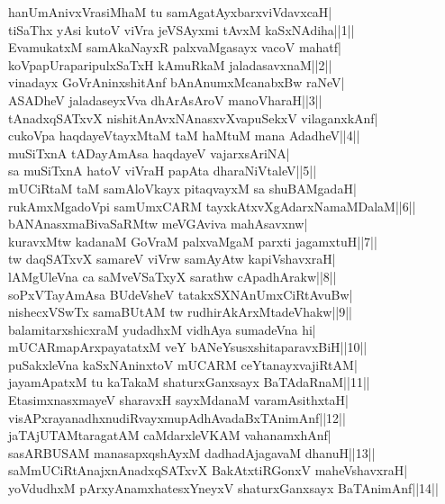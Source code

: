 \documentclass{article}
\begin{document}
hanUmAnivxVrasiMhaM tu samAgatAyxbarxviVdavxcaH|\\
tiSaThx yAsi kutoV viVra jeVSAyxmi tAvxM kaSxNAdiha||1||\\
EvamukatxM samAkaNayxR palxvaMgasayx vacoV mahatf|\\
koVpapUraparipulxSaTxH kAmuRkaM jaladasavxnaM||2||\\
vinadayx GoVrAninxshitAnf bAnAnumxMcanabxBw raNeV|\\
ASADheV jaladaseyxVva dhArAsAroV manoVharaH||3||\\
tAnadxqSATxvX nishitAnAvxNAnasxvXvapuSekxV vilaganxkAnf|\\
cukoVpa haqdayeVtayxMtaM taM haMtuM mana AdadheV||4||\\
muSiTxnA tADayAmAsa haqdayeV vajarxsAriNA|\\
sa muSiTxnA hatoV viVraH papAta dharaNiVtaleV||5||\\
mUCiRtaM taM samAloVkayx pitaqvayxM sa shuBAMgadaH|\\
rukAmxMgadoVpi samUmxCARM tayxkAtxvXgAdarxNamaMDalaM||6||\\
bANAnasxmaBivaSaRMtw meVGAviva mahAsavxnw|\\
kuravxMtw kadanaM GoVraM palxvaMgaM parxti jagamxtuH||7||\\
tw daqSATxvX samareV viVrw samAyAtw kapiVshavxraH|\\
lAMgUleVna ca saMveVSaTxyX sarathw cApadhArakw||8||\\
soPxVTayAmAsa BUdeVsheV tatakxSXNAnUmxCiRtAvuBw|\\
nishecxVSwTx samaBUtAM tw rudhirAkArxMtadeVhakw||9||\\
balamitarxshicxraM yudadhxM vidhAya sumadeVna hi|\\
mUCARmapArxpayatatxM veY bANeYsusxshitaparavxBiH||10||\\
puSakxleVna kaSxNAninxtoV mUCARM ceYtanayxvajiRtAM|\\
jayamApatxM tu kaTakaM shaturxGanxsayx BaTAdaRnaM||11||\\
EtasimxnasxmayeV sharavxH sayxMdanaM varamAsithxtaH|\\
visAPxrayanadhxnudiRvayxmupAdhAvadaBxTAnimAnf||12||\\
jaTAjUTAMtaragatAM caMdarxleVKAM vahanamxhAnf|\\
sasARBUSAM manasapxqshAyxM dadhadAjagavaM dhanuH||13||\\
saMmUCiRtAnajxnAnadxqSATxvX BakAtxtiRGonxV maheVshavxraH|\\
yoVdudhxM pArxyAnamxhatesxYneyxV shaturxGanxsayx BaTAnimAnf||14||\\
\end{document}
